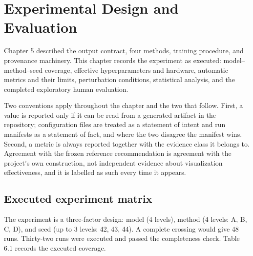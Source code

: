 \chapter{Experimental Design and Evaluation}

Chapter 5 described the output contract, four methods, training procedure, and provenance machinery. This chapter records the experiment as executed: model--method--seed coverage, effective hyperparameters and hardware, automatic metrics and their limits, perturbation conditions, statistical analysis, and the completed exploratory human evaluation.

Two conventions apply throughout the chapter and the two that follow. First, a value is reported only if it can be read from a generated artifact in the repository; configuration files are treated as a statement of intent and run manifests as a statement of fact, and where the two disagree the manifest wins. Second, a metric is always reported together with the evidence class it belongs to. Agreement with the frozen reference recommendation is agreement with the project's own construction, not independent evidence about visualization effectiveness, and it is labelled as such every time it appears.

\section{Executed experiment matrix}

The experiment is a three-factor design: model (4 levels), method (4 levels: A, B, C, D), and seed (up to 3 levels: 42, 43, 44). A complete crossing would give 48 runs. Thirty-two runs were executed and passed the completeness check. Table 6.1 records the executed coverage.

